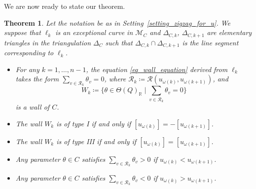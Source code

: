 \documentclass[10pt,a4paper]{amsart}
\numberwithin{equation}{section}
\newtheorem{Theorem}{Theorem}[section]
\theoremstyle{definition}
\newcommand{\RR}{\mathbb{R}}
\newcommand{\calM}{\mathcal{M}}
\newcommand{\calR}{\mathcal{R}}
\newcommand{\typeIII}{{\rm I\hspace{-0.7pt}I\hspace{-0.7pt}I}}
\newcommand{\permII}{\omega}
\begin{document}
We are now ready to state our theorem.


\begin{Theorem}\label{thm_main_wall}
Let the notation be as in Setting~{\rm \ref{setting_zigzag_for_u}}.
We suppose that $\ell_k$ is an exceptional curve in $\calM_C$
and $\Delta_{C,k}$, $\Delta_{C,k+1}$ are elementary triangles in the triangulation $\Delta_C$ such that $\Delta_{C,k}\cap \Delta_{C,k+1}$
is the line segment corresponding to $\ell_k$.
\begin{itemize}\itemsep=0pt
\item[$(1)\hphantom{{}'}$]
For any $k=1, \dots, n-1$, the equation \eqref{eq_wall_equation} derived from $\ell_k$ takes the form
$\sum_{v\in \calR_k}\theta_v=0$, where $\calR_k\coloneqq\calR(u_{\permII(k)}, u_{\permII(k+1)})$, and
\[
W_{k}\coloneqq\biggl\{\theta\in\Theta(Q)_\RR \mid \sum_{v\in \calR_k}\theta_v=0\biggr\}
\]
is a wall of $C$.
\item[$(2)\hphantom{{}'}$] The wall $W_k$ is of type {\rm I} if and only if $[u_{\permII(k)}]= -[u_{\permII(k+1)}]$.
\item[$(2)'$] The wall $W_k$ is of type {\typeIII} if and only if $[u_{\permII(k)}]=[u_{\permII(k+1)}]$.
\item[$(3)\hphantom{{}'}$] Any parameter $\theta\in C$ satisfies $\sum_{v\in \calR_k}\theta_v>0$ if $u_{\permII(k)}< u_{\permII(k+1)}$.
\item[$(3)'$] Any parameter $\theta\in C$ satisfies $\sum_{v\in \calR_k}\theta_v<0$ if $u_{\permII(k)}> u_{\permII(k+1)}$.
\end{itemize}
\end{Theorem}
\end{document}
